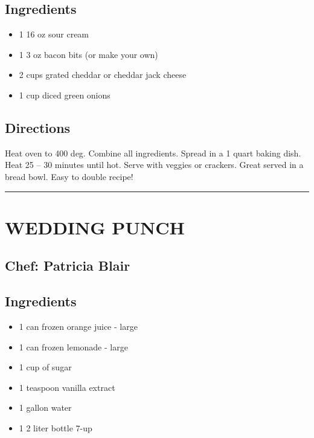 \documentclass[
]{book}
\providecommand{\tightlist}{%
  \setlength{\itemsep}{0pt}\setlength{\parskip}{0pt}}
\begin{document}
\hypertarget{ingredients-11}{%
\subsection*{Ingredients}\label{ingredients-11}}


\begin{itemize}
\tightlist
\item
  1 16 oz sour cream
\item
  1 3 oz bacon bits (or make your own)
\item
  2 cups grated cheddar or cheddar jack cheese
\item
  1 cup diced green onions
\end{itemize}

\hypertarget{directions-11}{%
\subsection*{Directions}\label{directions-11}}


Heat oven to 400 deg. Combine all ingredients.
Spread in a 1 quart baking dish. Heat 25 -- 30 minutes until hot.
Serve with veggies or crackers.
Great served in a bread bowl. Easy to double recipe!

\begin{center}\rule{0.5\linewidth}{0.5pt}\end{center}

\hypertarget{wedding-punch}{%
\section*{WEDDING PUNCH}\label{wedding-punch}}


\hypertarget{chef-patricia-blair-4}{%
\subsection*{Chef: Patricia Blair}\label{chef-patricia-blair-4}}


\hypertarget{ingredients-12}{%
\subsection*{Ingredients}\label{ingredients-12}}


\begin{itemize}
\tightlist
\item
  1 can frozen orange juice - large
\item
  1 can frozen lemonade - large
\item
  1 cup of sugar
\item
  1 teaspoon vanilla extract
\item
  1 gallon water
\item
  1 2 liter bottle 7-up
\end{itemize}
\end{document}
